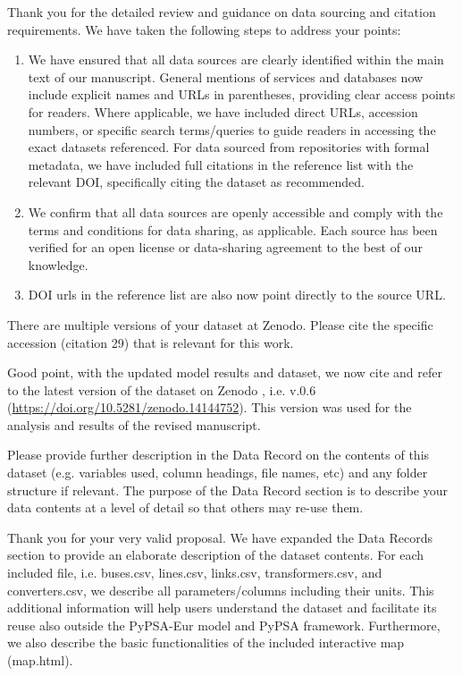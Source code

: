 \documentclass{response}
\begin{document}
\AR Thank you for the detailed review and guidance on data sourcing and citation requirements. We have taken the following steps to address your points:

\begin{enumerate}
    \item We have ensured that all data sources are clearly identified within the main text of our manuscript. General mentions of services and databases now include explicit names and URLs in parentheses, providing clear access points for readers. Where applicable, we have included direct URLs, accession numbers, or specific search terms/queries to guide readers in accessing the exact datasets referenced. For data sourced from repositories with formal metadata, we have included full citations in the reference list with the relevant DOI, specifically citing the dataset as recommended.
    \item We confirm that all data sources are openly accessible and comply with the terms and conditions for data sharing, as applicable. Each source has been verified for an open license or data-sharing agreement to the best of our knowledge.
    \item DOI urls in the reference list are also now point directly to the source URL.
\end{enumerate}

\EC There are multiple versions of your dataset at Zenodo. Please cite the specific accession (citation 29) that is relevant for this work.

\AR Good point, with the updated model results and dataset, we now cite and refer to the latest version of the dataset on Zenodo \cite{xiongPrebuiltElectricityNetwork2024}, i.e. v.0.6 (\url{https://doi.org/10.5281/zenodo.14144752}). This version was used for the analysis and results of the revised manuscript.

\EC Please provide further description in the Data Record on the contents of this dataset (e.g. variables used, column headings, file names, etc) and any folder structure if relevant. The purpose of the Data Record section is to describe your data contents at a level of detail so that others may re-use them.

\label{ac:datarecords}
\AR Thank you for your very valid proposal. We have expanded the Data Records section to provide an elaborate description of the dataset contents. For each included file, i.e. buses.csv, lines.csv, links.csv, transformers.csv, and converters.csv, we describe all parameters/columns including their units. This additional information will help users understand the dataset and facilitate its reuse also outside the PyPSA-Eur model and PyPSA framework. Furthermore, we also describe the basic functionalities of the included interactive map (map.html).
\end{document}
